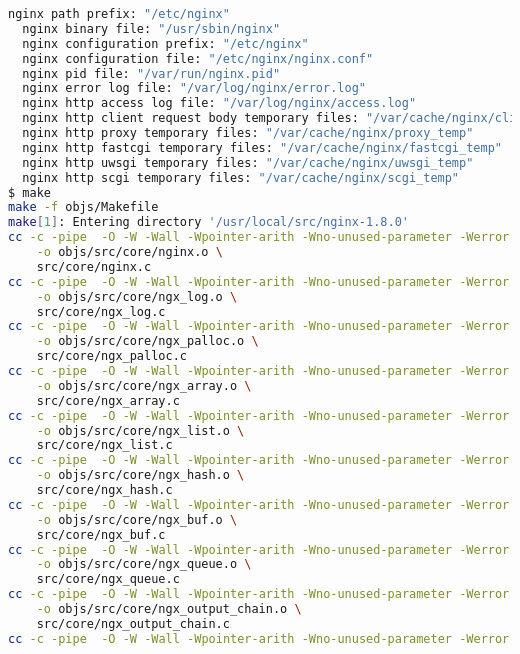 \begin{lstlisting}[language=bash]
  nginx path prefix: "/etc/nginx"
  nginx binary file: "/usr/sbin/nginx"
  nginx configuration prefix: "/etc/nginx"
  nginx configuration file: "/etc/nginx/nginx.conf"
  nginx pid file: "/var/run/nginx.pid"
  nginx error log file: "/var/log/nginx/error.log"
  nginx http access log file: "/var/log/nginx/access.log"
  nginx http client request body temporary files: "/var/cache/nginx/client_temp"
  nginx http proxy temporary files: "/var/cache/nginx/proxy_temp"
  nginx http fastcgi temporary files: "/var/cache/nginx/fastcgi_temp"
  nginx http uwsgi temporary files: "/var/cache/nginx/uwsgi_temp"
  nginx http scgi temporary files: "/var/cache/nginx/scgi_temp"
$ make
make -f objs/Makefile
make[1]: Entering directory '/usr/local/src/nginx-1.8.0'
cc -c -pipe  -O -W -Wall -Wpointer-arith -Wno-unused-parameter -Werror -g  -I src/core -I src/event -I src/event/modules -I src/os/unix -I objs \
	-o objs/src/core/nginx.o \
	src/core/nginx.c
cc -c -pipe  -O -W -Wall -Wpointer-arith -Wno-unused-parameter -Werror -g  -I src/core -I src/event -I src/event/modules -I src/os/unix -I objs \
	-o objs/src/core/ngx_log.o \
	src/core/ngx_log.c
cc -c -pipe  -O -W -Wall -Wpointer-arith -Wno-unused-parameter -Werror -g  -I src/core -I src/event -I src/event/modules -I src/os/unix -I objs \
	-o objs/src/core/ngx_palloc.o \
	src/core/ngx_palloc.c
cc -c -pipe  -O -W -Wall -Wpointer-arith -Wno-unused-parameter -Werror -g  -I src/core -I src/event -I src/event/modules -I src/os/unix -I objs \
	-o objs/src/core/ngx_array.o \
	src/core/ngx_array.c
cc -c -pipe  -O -W -Wall -Wpointer-arith -Wno-unused-parameter -Werror -g  -I src/core -I src/event -I src/event/modules -I src/os/unix -I objs \
	-o objs/src/core/ngx_list.o \
	src/core/ngx_list.c
cc -c -pipe  -O -W -Wall -Wpointer-arith -Wno-unused-parameter -Werror -g  -I src/core -I src/event -I src/event/modules -I src/os/unix -I objs \
	-o objs/src/core/ngx_hash.o \
	src/core/ngx_hash.c
cc -c -pipe  -O -W -Wall -Wpointer-arith -Wno-unused-parameter -Werror -g  -I src/core -I src/event -I src/event/modules -I src/os/unix -I objs \
	-o objs/src/core/ngx_buf.o \
	src/core/ngx_buf.c
cc -c -pipe  -O -W -Wall -Wpointer-arith -Wno-unused-parameter -Werror -g  -I src/core -I src/event -I src/event/modules -I src/os/unix -I objs \
	-o objs/src/core/ngx_queue.o \
	src/core/ngx_queue.c
cc -c -pipe  -O -W -Wall -Wpointer-arith -Wno-unused-parameter -Werror -g  -I src/core -I src/event -I src/event/modules -I src/os/unix -I objs \
	-o objs/src/core/ngx_output_chain.o \
	src/core/ngx_output_chain.c
cc -c -pipe  -O -W -Wall -Wpointer-arith -Wno-unused-parameter -Werror -g  -I src/core -I src/event -I src/event/modules -I src/os/unix -I objs \

\end{lstlisting}
